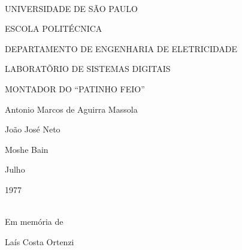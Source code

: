 \documentclass[a4paper,12pt]{article}
\begin{document}
\ttfamily

\noindent \\

\vspace{2em}
\hspace{5em} UNIVERSIDADE DE SÃO PAULO\par
\hspace{7em} ESCOLA POLITÉCNICA\par
\hspace{0.5em} DEPARTAMENTO DE ENGENHARIA DE ELETRICIDADE\par
\hspace{3em} LABORATÕRIO DE SISTEMAS DIGITAIS\par

\vspace{19em}
\hspace{4.5em} MONTADOR DO ``PATINHO FEIO''\par

\vspace{7em}
\hspace{7.5em} Antonio Marcos de Aguirra Massola\par
\hspace{7.5em} João José Neto\par
\hspace{7.5em} Moshe Bain\par

\vspace{7em}
\hspace{9.5em} Julho\par
\hspace{9.75em} 1977

\newpage

\noindent \\

\vspace{21em}
\hspace{6.5em} Em memória de\par
\hspace{6.5em} Laís Costa Ortenzi\par

\newpage

\setcounter{page}{1}

\renewcommand\contentsname{\ttfamily \hskip 13em \uline{INDICE}\\
\\
\uline{Assunto} \hskip 22.5em \uline{Página}}
\tableofcontents

\newpage
\end{document}
